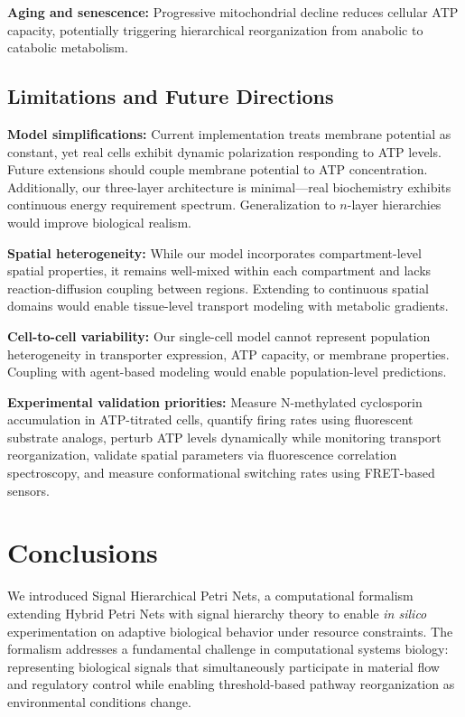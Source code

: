 \documentclass[10pt,letterpaper]{article}
\begin{document}
\textbf{Aging and senescence:} Progressive mitochondrial decline reduces cellular ATP capacity, potentially triggering hierarchical reorganization from anabolic to catabolic metabolism.

\subsection{Limitations and Future Directions}

\textbf{Model simplifications:} Current implementation treats membrane potential as constant, yet real cells exhibit dynamic polarization responding to ATP levels. Future extensions should couple membrane potential to ATP concentration. Additionally, our three-layer architecture is minimal---real biochemistry exhibits continuous energy requirement spectrum. Generalization to $n$-layer hierarchies would improve biological realism.

\textbf{Spatial heterogeneity:} While our model incorporates compartment-level spatial properties, it remains well-mixed within each compartment and lacks reaction-diffusion coupling between regions. Extending to continuous spatial domains would enable tissue-level transport modeling with metabolic gradients.

\textbf{Cell-to-cell variability:} Our single-cell model cannot represent population heterogeneity in transporter expression, ATP capacity, or membrane properties. Coupling with agent-based modeling would enable population-level predictions.

\textbf{Experimental validation priorities:} Measure N-methylated cyclosporin accumulation in ATP-titrated cells, quantify firing rates using fluorescent substrate analogs, perturb ATP levels dynamically while monitoring transport reorganization, validate spatial parameters via fluorescence correlation spectroscopy, and measure conformational switching rates using FRET-based sensors.

\section{Conclusions}

We introduced Signal Hierarchical Petri Nets, a computational formalism extending Hybrid Petri Nets with signal hierarchy theory to enable \textit{in silico} experimentation on adaptive biological behavior under resource constraints. The formalism addresses a fundamental challenge in computational systems biology: representing biological signals that simultaneously participate in material flow and regulatory control while enabling threshold-based pathway reorganization as environmental conditions change.
\end{document}
